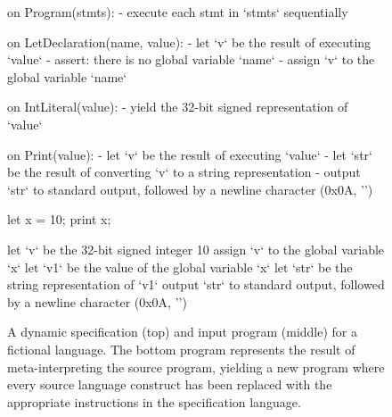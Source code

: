 \begin{figure}
  \begin{plain}
on Program(stmts):
  - execute each stmt in `stmts` sequentially

on LetDeclaration(name, value):
  - let `v` be the result of executing `value`
  - assert: there is no global variable `name`
  - assign `v` to the global variable `name`

on IntLiteral(value):
  - yield the 32-bit signed representation of `value`

on Print(value):
  - let `v` be the result of executing `value`
  - let `str` be the result of converting `v` to a string representation
  - output `str` to standard output, followed by a newline character (0x0A, '\n')
  \end{plain}
  \begin{plain}
let x = 10;
print x;
  \end{plain}
\begin{plain}
let `v` be the 32-bit signed integer 10
assign `v` to the global variable `x`
let `v1` be the value of the global variable `x`
let `str` be the string representation of `v1`
output `str` to standard output, followed by a newline character (0x0A, '\n')
\end{plain}
  \caption{A dynamic specification (top) and input program (middle) for a fictional language. The bottom program represents the result of meta-interpreting the source program, yielding a new program where every source language construct has been replaced with the appropriate instructions in the specification language.}
  \label{fig:meta_interpretation}
\end{figure}